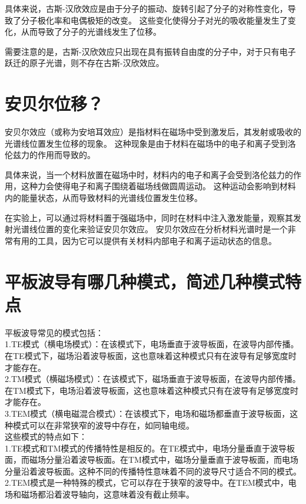 \documentclass[12pt, a4paper, oneside]{article}
\begin{document}
\begin{spacing}{2.0}
具体来说，古斯-汉欣效应是由于分子的振动、旋转引起了分子的对称性变化，导致了分子极化率和电偶极矩的改变。
这些变化使得分子对光的吸收能量发生了变化，从而导致了分子的光谱线发生了位移。

需要注意的是，古斯-汉欣效应只出现在具有振转自由度的分子中，对于只有电子跃迁的原子光谱，则不存在古斯-汉欣效应。

\section{安贝尔位移？}
安贝尔效应（或称为安培耳效应）是指材料在磁场中受到激发后，其发射或吸收的光谱线位置发生位移的现象。
这种现象是由于材料在磁场中的电子和离子受到洛伦兹力的作用而导致的。

具体来说，当一个材料放置在磁场中时，材料内的电子和离子会受到洛伦兹力的作用，这种力会使得电子和离子围绕着磁场线做圆周运动。
这种运动会影响到材料内的能量状态，从而导致材料的光谱线位置发生位移。

在实验上，可以通过将材料置于强磁场中，同时在材料中注入激发能量，观察其发射光谱线位置的变化来验证安贝尔效应。
安贝尔效应在分析材料光谱时是一个非常有用的工具，因为它可以提供有关材料内部电子和离子运动状态的信息。





\section{平板波导有哪几种模式，简述几种模式特点}

平板波导常见的模式包括：
\\
1.TE模式（横电场模式）：在该模式下，电场垂直于波导板面，在波导内部传播。在TE模式下，磁场沿着波导板面，这也意味着这种模式只有在波导有足够宽度时才能存在。
\\
2.TM模式（横磁场模式）：在该模式下，磁场垂直于波导板面，在波导内部传播。在TM模式下，电场沿着波导板面，这也意味着这种模式只有在波导有足够宽度时才能存在。
\\
3.TEM模式（横电磁混合模式）：在该模式下，电场和磁场都垂直于波导板面，这种模式可以在非常狭窄的波导中存在，如同轴电缆。
\\
这些模式的特点如下：
\\
1.TE模式和TM模式的传播特性是相反的。在TE模式中，电场分量垂直于波导板面，而磁场分量沿着波导板面。在TM模式中，磁场分量垂直于波导板面，而电场分量沿着波导板面。这种不同的传播特性意味着不同的波导尺寸适合不同的模式。
\\
2.TEM模式是一种特殊的模式，它可以存在于狭窄的波导中。在TEM模式中，电场和磁场都沿着波导轴向，这意味着没有截止频率。

\end{spacing}
\end{document}

